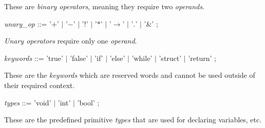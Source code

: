 \documentclass{article}
\begin{document}
\noindent These are \textit{binary operators}, meaning they require two \textit{operands}.

\noindent\textit{unary\_op} ::=
    '$+$'
    $|$ '$-$'
    $|$ '$!$'
    $|$ '$*$'
    $|$ '$\rightarrow$'
    $|$ '$.$'
    $|$ '$\&$'
    ;

\noindent\textit{Unary operators} require only one \textit{operand}.

\noindent\textit{keywords} ::=
    'true' $|$ 'false' $|$ 'if' $|$ 'else' $|$ 'while' $|$ 'struct' $|$ 'return'
    ;

\noindent These are the \textit{keywords} which are reserved words and cannot be used outside of their required context.

\noindent\textit{types} ::=
    'void' $|$ 'int' $|$ 'bool' ;
    
\noindent These are the predefined primitive \textit{types} that are used for declaring variables, etc.
\end{document}
